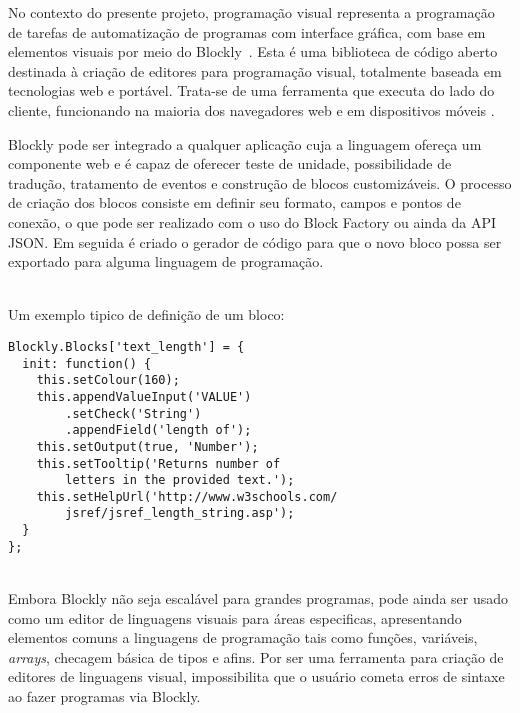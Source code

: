 \documentclass[12pt]{article}
\begin{document}
	No contexto do presente projeto, programação visual representa a programação de tarefas de automatização de programas com interface gráfica, com base em elementos visuais por meio do Blockly~\cite{blockly}. Esta é uma biblioteca de código aberto destinada à criação de editores para programação visual, totalmente baseada em tecnologias web e portável. Trata-se de uma ferramenta que executa do lado do cliente, funcionando na maioria dos navegadores web e em dispositivos móveis \cite{blockly}.
	
	Blockly pode ser integrado a qualquer aplicação cuja a linguagem ofereça um componente web e é capaz de oferecer teste de unidade, possibilidade de tradução, tratamento de eventos e construção de blocos customizáveis. O processo de criação dos blocos consiste em definir seu formato, campos e pontos de conexão, o que pode ser realizado com o uso do Block Factory ou ainda da API JSON. 
	Em seguida é criado o gerador de código para que o novo bloco possa ser exportado para alguma linguagem de programação.
	
	~\\
	Um exemplo tipico de definição de um bloco:
	

	\begin{lstlisting}[frame=single]
Blockly.Blocks['text_length'] = {
  init: function() {
	this.setColour(160);
	this.appendValueInput('VALUE')
		.setCheck('String')
		.appendField('length of');
	this.setOutput(true, 'Number');
	this.setTooltip('Returns number of 
		letters in the provided text.');
	this.setHelpUrl('http://www.w3schools.com/
		jsref/jsref_length_string.asp');
  }
};
    \end{lstlisting}
    
	~\\
	Embora Blockly não seja escalável para grandes programas, pode ainda ser usado como um editor de linguagens visuais para áreas especificas, apresentando elementos comuns a linguagens de programação tais como funções, variáveis, \emph{arrays}, checagem básica de tipos e afins. Por ser uma ferramenta para criação de editores de linguagens visual, impossibilita que o usuário cometa erros de sintaxe ao fazer programas via Blockly.
	
\end{document}
